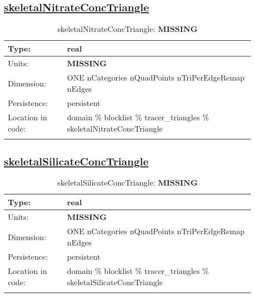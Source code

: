 \subsection[skeletalNitrateConcTriangle]{\hyperref[sec:var_tab_tracer_triangles]{skeletalNitrateConcTriangle}}
\label{subsec:var_sec_tracer_triangles_skeletalNitrateConcTriangle}
\begin{center}
\begin{longtable}{| p{2.0in} | p{4.0in} |}
        \hline 
        Type: & real \\
        \hline 
        Units: & {\bf \color{red} MISSING} \\
        \hline 
        Dimension: & ONE nCategories nQuadPoints nTriPerEdgeRemap nEdges \\
        \hline 
        Persistence: & persistent \\
        \hline 
         Location in code: & domain \% blocklist \% tracer\_triangles \% skeletalNitrateConcTriangle \\
         \hline 
    \caption{skeletalNitrateConcTriangle: {\bf \color{red} MISSING}}
\end{longtable}
\end{center}
\subsection[skeletalSilicateConcTriangle]{\hyperref[sec:var_tab_tracer_triangles]{skeletalSilicateConcTriangle}}
\label{subsec:var_sec_tracer_triangles_skeletalSilicateConcTriangle}
\begin{center}
\begin{longtable}{| p{2.0in} | p{4.0in} |}
        \hline 
        Type: & real \\
        \hline 
        Units: & {\bf \color{red} MISSING} \\
        \hline 
        Dimension: & ONE nCategories nQuadPoints nTriPerEdgeRemap nEdges \\
        \hline 
        Persistence: & persistent \\
        \hline 
         Location in code: & domain \% blocklist \% tracer\_triangles \% skeletalSilicateConcTriangle \\
         \hline 
    \caption{skeletalSilicateConcTriangle: {\bf \color{red} MISSING}}
\end{longtable}
\end{center}
